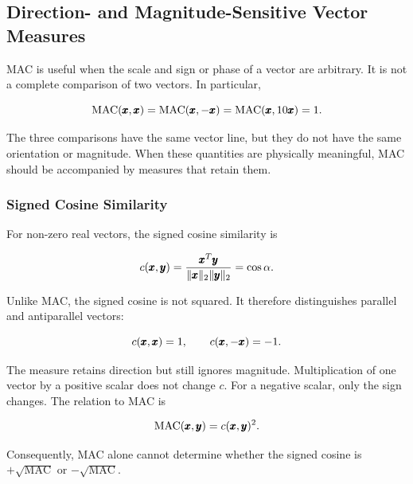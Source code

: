 \subsection{Direction- and Magnitude-Sensitive Vector Measures}

MAC is useful when the scale and sign or phase of a vector are arbitrary. It is
not a complete comparison of two vectors. In particular,

\begin{equation}
    \operatorname{MAC}(\pmb{x},\pmb{x})
    =\operatorname{MAC}(\pmb{x},-\pmb{x})
    =\operatorname{MAC}(\pmb{x},10\pmb{x})=1.
\end{equation}

The three comparisons have the same vector line, but they do not have the same
orientation or magnitude. When these quantities are physically meaningful, MAC
should be accompanied by measures that retain them.

\subsubsection{Signed Cosine Similarity}

For non-zero real vectors, the signed cosine similarity is

\begin{bbox}
    \begin{equation}\label{signed-cosine-similarity}
        c(\pmb{x},\pmb{y})
        =
        \frac{\pmb{x}^{T}\pmb{y}}
        {\| {\pmb{x}} \|_2\| {\pmb{y}} \|_2}
        =\cos\alpha.
    \end{equation}
\end{bbox}

Unlike MAC, the signed cosine is not squared. It therefore distinguishes
parallel and antiparallel vectors:

\begin{equation}
    c(\pmb{x},\pmb{x})=1,
    \qquad
    c(\pmb{x},-\pmb{x})=-1.
\end{equation}

The measure retains direction but still ignores magnitude. Multiplication of
one vector by a positive scalar does not change $c$. For a negative scalar, only
the sign changes. The relation to MAC is

\begin{equation}\label{mac-signed-cosine-relation}
    \operatorname{MAC}(\pmb{x},\pmb{y})=c(\pmb{x},\pmb{y})^2.
\end{equation}

Consequently, MAC alone cannot determine whether the signed cosine is
$+\sqrt{\operatorname{MAC}}$ or $-\sqrt{\operatorname{MAC}}$.

